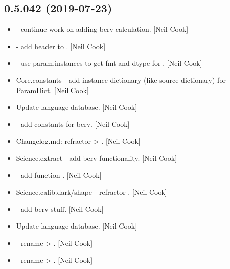 \documentclass[a4paper,10pt,english]{report}
\begin{document}
\subsection{0.5.042 (2019-07-23)}
\label{\detokenize{misc/changelog:id100}}\begin{itemize}
\item {} 
 - continue work on adding berv calculation.
{[}Neil Cook{]}

\item {} 
 - add header to . {[}Neil Cook{]}

\item {} 
 - use param.instances to get fmt and dtype for .
{[}Neil Cook{]}

\item {} 
Core.constants - add instance dictionary (like source dictionary) for
ParamDict. {[}Neil Cook{]}

\item {} 
Update language database. {[}Neil Cook{]}

\item {} 
 - add constants for berv. {[}Neil Cook{]}

\item {} 
Changelog.md: refractor  \textendash{}\textgreater{} . {[}Neil Cook{]}

\item {} 
Science.extract - add berv functionality. {[}Neil Cook{]}

\item {} 
 - add function . {[}Neil Cook{]}

\item {} 
Science.calib.dark/shape - refractor .
{[}Neil Cook{]}

\item {} 
 - add berv stuff. {[}Neil Cook{]}

\item {} 
Update language database. {[}Neil Cook{]}

\item {} 
 - rename  \textendash{}\textgreater{} . {[}Neil Cook{]}

\item {} 
 - rename  \textendash{}\textgreater{} . {[}Neil
Cook{]}

\end{itemize}
\end{document}
